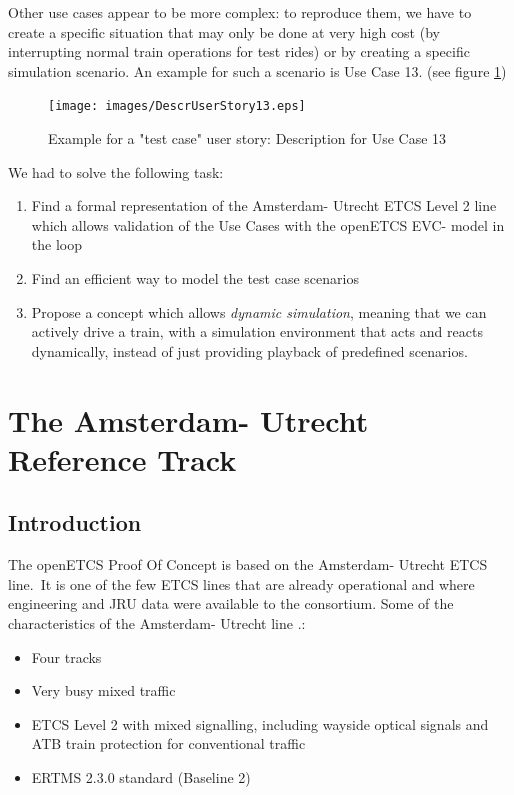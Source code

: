 \documentclass{template/openetcs_article}
\begin{document}
Other use cases appear to be more complex: to reproduce them, we have to create a specific situation that may only be done at very high cost (by interrupting normal train operations for test rides) or by creating a specific simulation scenario. An example for such a scenario is Use Case 13. (see figure \ref{fig:d-us13})

\begin{figure}
  \centering
  \texttt{[image: images/DescrUserStory13.eps]}
  \caption{Example for a "test case" user story: Description for Use Case 13}
  \label{fig:d-us13}
\end{figure}


We had to solve the following task:

\begin{enumerate}
 \item Find a formal representation of the Amsterdam- Utrecht ETCS Level 2 line which allows validation of the Use Cases with the openETCS EVC- model in the loop
 \item Find an efficient way to model the test case scenarios
 \item Propose a concept which allows \emph{dynamic simulation}, meaning that we can actively drive a train, with a simulation environment that acts and reacts dynamically, instead of just providing playback of predefined scenarios.
\end {enumerate}



\section{The Amsterdam- Utrecht Reference Track}
\subsection{Introduction}

The openETCS Proof Of Concept is based on the Amsterdam- Utrecht ETCS line.\
It is one of the few ETCS lines that are already operational and where engineering and JRU data were available to the consortium.\newline
Some of the characteristics of the Amsterdam- Utrecht line  \cite{muttram08}.:
\begin{itemize}
 \item Four tracks
 \item Very busy mixed traffic
 \item ETCS Level 2 with mixed signalling, including wayside optical signals and ATB train protection for conventional traffic
 \item ERTMS 2.3.0 standard (Baseline 2)
\end{itemize}
\end{document}
